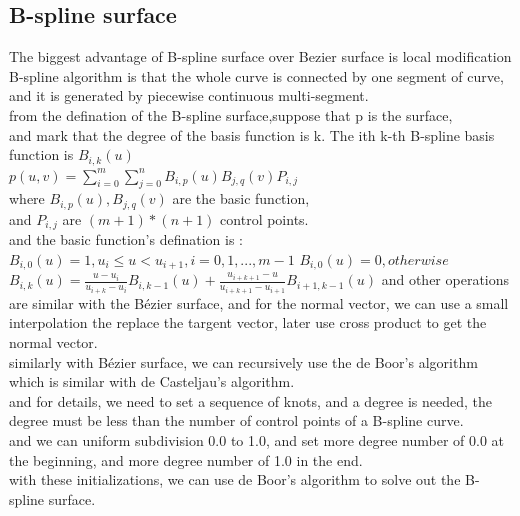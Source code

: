\documentclass[acmtog]{acmart}
\begin{document}
\subsection{B-spline surface}
The biggest advantage of B-spline surface over Bezier surface is local modification\\
B-spline algorithm is that the whole curve is connected by one segment of curve, and it is generated by piecewise continuous multi-segment.\\
from the defination of the B-spline surface,suppose that p is the surface,\\
and mark that the degree of the basis function is k. The ith k-th B-spline basis function is $B_{i,k}(u)$\\
$p(u,v)=\sum_{i=0}^m\sum_{j=0}^n B_{i,p}(u)B_{j,q}(v)P_{i,j}$\\
where $B_{i,p}(u),B_{j,q}(v)$ are the basic function,\\
and $P_{i,j}$ are $(m+1)*(n+1)$ control points.\\
and the basic function's defination is :\\
$B_{i,0}(u)= 1, u_i \leq u < u_{i+1}, i=0,1,...,m-1$
$B_{i,0}(u)= 0, otherwise$
$B_{i,k}(u) = \frac{u-u_i}{u_{i+k}-u_i}B_{i,k-1}(u)+\frac{u_{i+k+1}-u}{u_{i+k+1}-u_{i+1}}B_{i+1,k-1}(u)$
and other operations are similar with the Bézier surface,
and for the normal vector, we can use a small interpolation the replace the targent vector, later use cross product to get the normal vector.\\
similarly with Bézier surface, we can recursively use the de Boor's algorithm which is similar with de Casteljau's algorithm.\\
and for details, we need to set a sequence of knots, and a degree is needed, the degree must be less than the number of control points of a B-spline curve.\\
and we can uniform subdivision 0.0 to 1.0, and set more degree number of 0.0 at the beginning, and more degree number of 1.0 in the end.\\
with these initializations, we can use de Boor's algorithm to solve out the B-spline surface.
\end{document}
